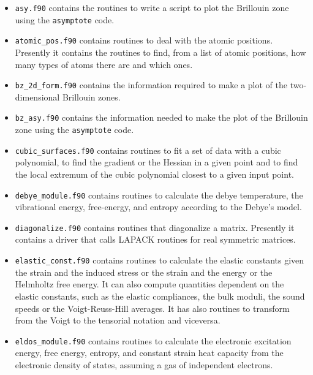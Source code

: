 \documentclass[12pt,a4paper,twoside]{report}
\begin{document}
\begin{itemize}

\item
\texttt{asy.f90} contains the routines to write a script to plot the
Brillouin zone using the \texttt{asymptote} code.

\item
\texttt{atomic\_pos.f90} contains routines to deal with the atomic positions.
Presently it contains the routines to find, from a list of atomic positions,
how many types of atoms there are and which ones.

\item
\texttt{bz\_2d\_form.f90} contains the information required to make a
plot of the two-dimensional Brillouin zones.

\item
\texttt{bz\_asy.f90} contains the information needed to make the plot       
of the Brillouin zone using the \texttt{asymptote} code.      

\item
\texttt{cubic\_surfaces.f90} contains routines to fit a set of data
with a cubic polynomial, to find the gradient or the Hessian in 
a given point and to find the local extremum of the cubic polynomial
closest to a given input point. 

\item
\texttt{debye\_module.f90} contains routines to calculate the debye 
temperature, the vibrational energy, free-energy, and entropy according
to the Debye's model.

\item
\texttt{diagonalize.f90} contains routines that diagonalize a matrix.
Presently it contains a driver that calls LAPACK routines
for real symmetric matrices.

\item
\texttt{elastic\_const.f90} contains routines to calculate the elastic
constants given the strain and the induced stress or the strain and
the energy or the Helmholtz free energy. It can also compute
quantities dependent on the elastic constants, such as the elastic 
compliances, the bulk moduli, the sound speeds or the Voigt-Reuss-Hill 
averages. It has also routines to transform from the Voigt to the 
tensorial notation and viceversa.

\item
\texttt{eldos\_module.f90} contains routines to calculate the electronic
excitation energy, free energy, entropy, and constant strain heat capacity
from the electronic density of states, assuming a gas of independent 
electrons.   


\end{itemize}
\end{document}
